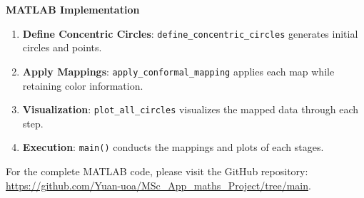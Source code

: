 \textbf{MATLAB Implementation}

\begin{enumerate}
    \item \textbf{Define Concentric Circles}: \texttt{define\_concentric\_circles} generates initial circles and points.
    \item \textbf{Apply Mappings}: \texttt{apply\_conformal\_mapping} applies each map while retaining color information.
    \item \textbf{Visualization}: \texttt{plot\_all\_circles} visualizes the mapped data through each step.
    \item \textbf{Execution}: \texttt{main()} conducts the mappings and plots of each stages.    
\end{enumerate}
For the complete MATLAB code, please visit the GitHub repository: \url{https://github.com/Yuan-uoa/MSc_App_maths_Project/tree/main}.
